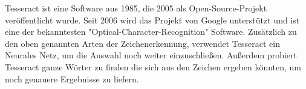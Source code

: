 
Tesseract ist eine Software aus 1985, die 2005 als Open-Source-Projekt veröffentlicht wurde. Seit 2006 wird das Projekt von Google unterstützt und ist eine der bekanntesten "Optical-Character-Recognition" Software. Zusätzlich zu den oben genannten Arten der Zeichenerkennung, verwendet Tesseract ein Neurales Netz, um die Auswahl noch weiter einzuschließen. Außerdem probiert Tesseract ganze Wörter zu finden die sich aus den Zeichen ergeben könnten, um noch genauere Ergebnisse zu liefern.\cite{OCRIntro}